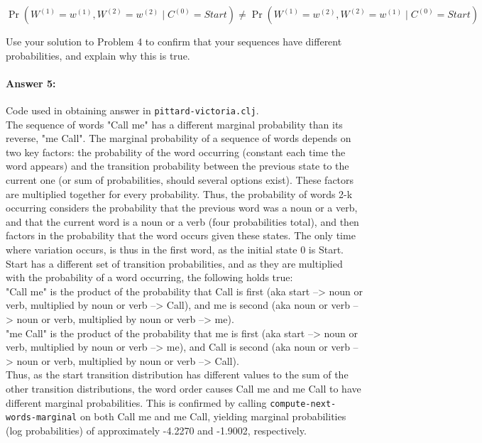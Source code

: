 \documentclass[10pt]{article}
\begin{document}
\begin{equation}
\nonumber
\Pr(W^{(1)}=w^{(1)}, W^{(2)} =w^{(2)} \mid C^{(0)}=Start ) \neq \Pr(W^{(1)}=w^{(2)}, W^{(2)} =w^{(1)} \mid C^{(0)}=Start )
\end{equation}

Use your solution to Problem 4 to confirm that your sequences have
different probabilities, and explain why this is true.

\paragraph{Answer 5:} Code used in obtaining answer in
\texttt{pittard-victoria.clj}.\\
The sequence of words "Call me" has a different marginal probability than its reverse, "me Call". The marginal probability of a sequence of words depends on two key factors: the probability of the word occurring (constant each time the word appears) and the transition probability between the previous state to the current one (or sum of probabilities, should several options exist). These factors are multiplied together for every probability. Thus, the probability of words 2-k occurring considers the probability that the previous word was a noun or a verb, and that the current word is a noun or a verb (four probabilities total), and then factors in the probability that the word occurs given these states. The only time where variation occurs, is thus in the first word, as the initial state 0 is Start. Start has a different set of transition probabilities, and as they are multiplied with the probability of a word occurring, the following holds true:\\
"Call me" is the product of the probability that Call is first (aka start --> noun or verb, multiplied by noun or verb --> Call), and me is second (aka noun or verb --> noun or verb, multiplied by noun or verb --> me). \\
"me Call" is the product of the probability that me is first (aka start --> noun or verb, multiplied by noun or verb --> me), and Call is second (aka noun or verb --> noun or verb, multiplied by noun or verb --> Call).\\
Thus, as the start transition distribution has different values to the sum of the other transition distributions, the word order causes Call me and me Call to have different marginal probabilities. This is confirmed by calling \texttt{compute-next-words-marginal} on both Call me and me Call, yielding marginal probabilities (log probabilities) of approximately -4.2270 and -1.9002, respectively.
\end{document}
